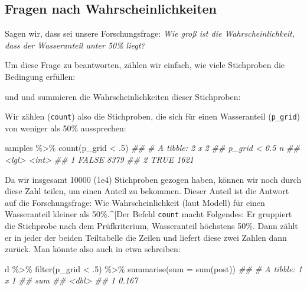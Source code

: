 \documentclass[
  a4paper,
  DIV=11]{scrreprt}
\newenvironment{Shaded}{\begin{snugshade}}{\end{snugshade}}
\newcommand{\AttributeTok}[1]{\textcolor[rgb]{0.40,0.45,0.13}{#1}}
\newcommand{\DecValTok}[1]{\textcolor[rgb]{0.68,0.00,0.00}{#1}}
\newcommand{\DocumentationTok}[1]{\textcolor[rgb]{0.37,0.37,0.37}{\textit{#1}}}
\newcommand{\FunctionTok}[1]{\textcolor[rgb]{0.28,0.35,0.67}{#1}}
\newcommand{\NormalTok}[1]{\textcolor[rgb]{0.00,0.23,0.31}{#1}}
\newcommand{\SpecialCharTok}[1]{\textcolor[rgb]{0.37,0.37,0.37}{#1}}
\theoremstyle{definition}
\theoremstyle{remark}
\begin{document}
\hypertarget{fragen-nach-wahrscheinlichkeiten}{%
\subsection{Fragen nach
Wahrscheinlichkeiten}\label{fragen-nach-wahrscheinlichkeiten}}

Sagen wir, dass sei unsere Forschungsfrage: \emph{Wie groß ist die
Wahrscheinlichkeit, dass der Wasseranteil unter 50\% liegt?}

Um diese Frage zu beantworten, zählen wir einfach, wie viele Stichproben
die Bedingung erfüllen:

und und summieren die Wahrscheinlichkeiten dieser Stichproben:

Wir zählen (\texttt{count}) also die Stichproben, die sich für einen
Wasseranteil (\texttt{p\_grid}) von weniger als 50\% aussprechen:

\begin{Shaded}
\begin{Highlighting}[]
\NormalTok{samples }\SpecialCharTok{\%\textgreater{}\%}
  \FunctionTok{count}\NormalTok{(p\_grid }\SpecialCharTok{\textless{}}\NormalTok{ .}\DecValTok{5}\NormalTok{) }
\DocumentationTok{\#\# \# A tibble: 2 x 2}
\DocumentationTok{\#\#   \textasciigrave{}p\_grid \textless{} 0.5\textasciigrave{}     n}
\DocumentationTok{\#\#   \textless{}lgl\textgreater{}          \textless{}int\textgreater{}}
\DocumentationTok{\#\# 1 FALSE           8379}
\DocumentationTok{\#\# 2 TRUE            1621}
\end{Highlighting}
\end{Shaded}

Da wir insgesamt 10000 (1e4) Stichproben gezogen haben, können wir noch
durch diese Zahl teilen, um einen Anteil zu bekommen. Dieser Anteil ist
die Antwort auf die Forschungsfrage: Wie Wahrscheinlichkeit (laut
Modell) für einen Wasseranteil kleiner als 50\%.\^{}{[}Der Befehl
\texttt{count} macht Folgendes: Er gruppiert die Stichprobe nach dem
Prüfkriterium, Wasseranteil höchstens 50\%. Dann zählt er in jeder der
beiden Teiltabelle die Zeilen und liefert diese zwei Zahlen dann zurück.
Man könnte also auch in etwa schreiben:

\begin{Shaded}
\begin{Highlighting}[]
\NormalTok{d }\SpecialCharTok{\%\textgreater{}\%}
  \FunctionTok{filter}\NormalTok{(p\_grid }\SpecialCharTok{\textless{}}\NormalTok{ .}\DecValTok{5}\NormalTok{) }\SpecialCharTok{\%\textgreater{}\%}
  \FunctionTok{summarise}\NormalTok{(}\AttributeTok{sum =} \FunctionTok{sum}\NormalTok{(post))}
\DocumentationTok{\#\# \# A tibble: 1 x 1}
\DocumentationTok{\#\#     sum}
\DocumentationTok{\#\#   \textless{}dbl\textgreater{}}
\DocumentationTok{\#\# 1 0.167}
\end{Highlighting}
\end{Shaded}
\end{document}
